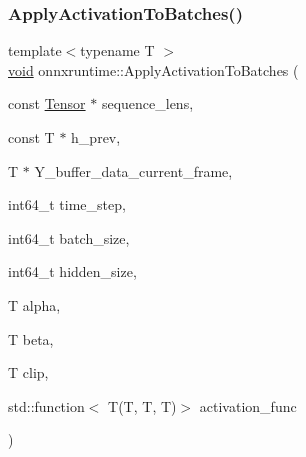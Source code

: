 \mbox{\label{namespaceonnxruntime_a7f33c4fcf18b2f695a036a3dbbcab208}} 
\subsubsection{\texorpdfstring{Apply\+Activation\+To\+Batches()}{ApplyActivationToBatches()}}
{\footnotesize\ttfamily template$<$typename T $>$ \\
\mbox{\hyperlink{mlasi_8h_a88f941d423cb2a819b70a1358982b1a6}{void}} onnxruntime\+::\+Apply\+Activation\+To\+Batches (\begin{DoxyParamCaption}\item[{const \mbox{\hyperlink{classonnxruntime_1_1Tensor}{Tensor}} $\ast$}]{sequence\+\_\+lens,  }\item[{const T $\ast$}]{h\+\_\+prev,  }\item[{T $\ast$}]{Y\+\_\+buffer\+\_\+data\+\_\+current\+\_\+frame,  }\item[{int64\+\_\+t}]{time\+\_\+step,  }\item[{int64\+\_\+t}]{batch\+\_\+size,  }\item[{int64\+\_\+t}]{hidden\+\_\+size,  }\item[{T}]{alpha,  }\item[{T}]{beta,  }\item[{T}]{clip,  }\item[{std\+::function$<$ T(T, T, T)$>$}]{activation\+\_\+func }\end{DoxyParamCaption})}

\mbox{\label{namespaceonnxruntime_a93a65209da9c0f629b39bbb2e6f31f38}} 
